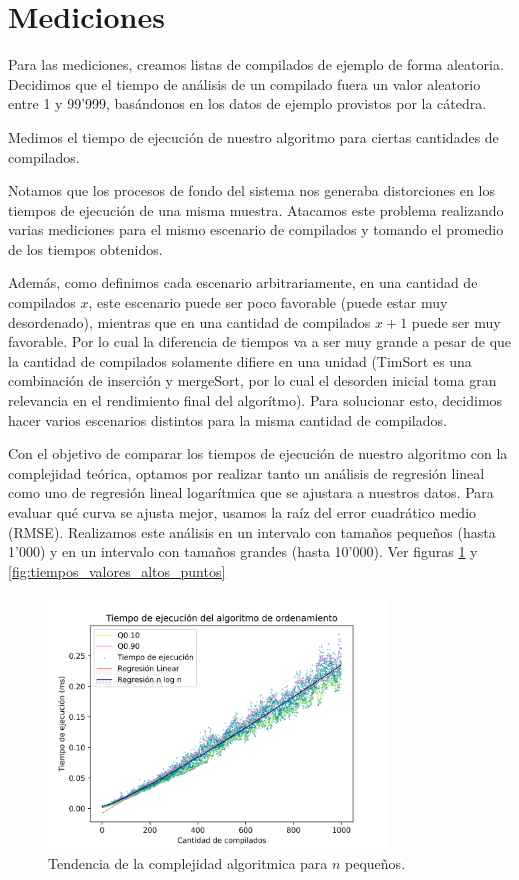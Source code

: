\section{Mediciones}

Para las mediciones, creamos listas de compilados de ejemplo de forma aleatoria. Decidimos que el tiempo
de análisis de un compilado fuera un valor aleatorio entre 1 y 99'999, basándonos en los datos de ejemplo
provistos por la cátedra.

Medimos el tiempo de ejecución de nuestro algoritmo para ciertas cantidades de compilados.

Notamos que los procesos de fondo del sistema nos generaba distorciones en los tiempos de ejecución de una misma muestra. Atacamos este problema
realizando varias mediciones para el mismo escenario de compilados y tomando el promedio de los tiempos obtenidos.

Además, como definimos cada escenario arbitrariamente, en una cantidad de compilados $x$, este escenario puede ser poco favorable (puede estar muy desordenado),
mientras que en una cantidad de compilados $x+1$ puede ser muy favorable. Por lo cual la diferencia de tiempos va a ser muy grande a pesar de que la cantidad
de compilados solamente difiere en una unidad (TimSort es una combinación de inserción y mergeSort, por lo cual el desorden inicial toma gran relevancia en el 
rendimiento final del algorítmo). Para solucionar esto, decidimos hacer varios escenarios distintos para la misma cantidad de compilados.

Con el objetivo de comparar los tiempos de ejecución de nuestro algoritmo con la complejidad teórica, optamos por 
realizar tanto un análisis de regresión lineal como uno de regresión lineal logarítmica que se ajustara a nuestros datos.
Para evaluar qué curva se ajusta mejor, usamos la raíz del error cuadrático medio (RMSE). Realizamos este análisis en un
intervalo con tamaños pequeños (hasta 1'000) y en un intervalo con tamaños grandes (hasta 10'000). Ver figuras \ref{fig:tiempos_valores_bajos_puntos} y
\ref{fig:tiempos_valores_altos_puntos}

\begin{figure}[H]
    \centering
    \includegraphics[width=0.8\textwidth]{img/tiempos_valores_bajos_puntos.png}
    \caption{Tendencia de la complejidad algoritmica para $n$ pequeños.}
    \label{fig:tiempos_valores_bajos_puntos}
\end{figure}


